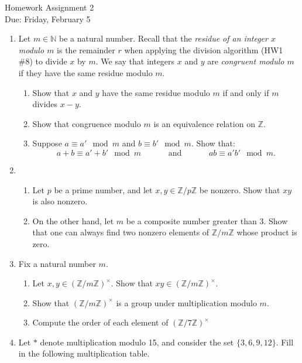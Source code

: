 \documentclass[11pt]{article}
\newcommand{\bN}{\mathbb{N}}
\newcommand{\bZ}{\mathbb{Z}}
\begin{document}
\begin{center}
	\Large {Homework Assignment 2}\\
	\small {Due: Friday, February 5}
\end{center}
\begin{enumerate}
    \item{
    Let $m\in\bN$ be a natural number.  Recall that the \textit{residue of an integer $x$ modulo $m$} is the remainder $r$ when applying the division algorithm (HW1 \#8) to divide $x$ by $m$.  We say that integers $x$ and $y$ are \textit{congruent modulo $m$} if they have the same residue modulo $m$.
    \begin{enumerate}
  	\item{
      Show that $x$ and $y$ have the same residue modulo $m$ if and only if $m$ divides $x-y$.
    	}
      \item{
      Show that congruence modulo $m$ is an equivalence relation on $\bZ$.
  	  }
      \item{
      Suppose $a\equiv a'\mod m$ and $b\equiv b'\mod m$.  Show that:
      \[a+b\equiv a'+b'\mod m\hspace{40pt}\text{and}\hspace{40pt}ab\equiv a'b'\mod m.\]
      }
    \end{enumerate}
    }
  \item{
    \begin{enumerate}
      \item{
      Let $p$ be a prime number, and let $x,y\in\bZ/p\bZ$ be nonzero.  Show that $xy$ is also nonzero.
      }
      \item{
      On the other hand, let $m$ be a composite number greater than 3.  Show that one can always find two nonzero elements of $\bZ/m\bZ$ whose product is zero.
      }
    \end{enumerate}
  }
  \item{
  Fix a natural number $m$.
  \begin{enumerate}
  	\item{
    Let $x,y\in(\bZ/m\bZ)^\times$.  Show that $xy\in(\bZ/m\bZ)^\times$.
    }
  	\item{
    Show that $(\bZ/m\bZ)^\times$ is a group under multiplication modulo $m$.
    }
  	\item{
    Compute the order of each element of $(\bZ/7\bZ)^\times$
    }
  \end{enumerate}
  }
	\item Let $*$ denote multiplication modulo 15, and consider the set $\{3,6,9,12\}$.  Fill in the following multiplication table.

\end{enumerate}
\end{document}
